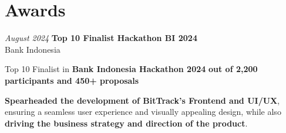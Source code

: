 \documentclass[../main.tex]{subfiles}
\begin{document}
\section{Awards}

\begin{twocolentry}{
    \textit{August 2024}
}
    \textbf{Top 10 Finalist Hackathon BI 2024}\\
    Bank Indonesia
\end{twocolentry}
\vspace{0.10 cm}
\begin{onecolentry}
\begin{highlights}
    \item Top 10 Finalist in \textbf{Bank Indonesia Hackathon 2024} \textbf{out of 2,200 participants and 450+ proposals}
    \item \textbf{Spearheaded the development of BitTrack's Frontend and UI/UX}, ensuring a seamless user experience and visually appealing design, while also \textbf{driving the business strategy and direction of the product}.
\end{highlights}
\end{onecolentry}
\end{document}
